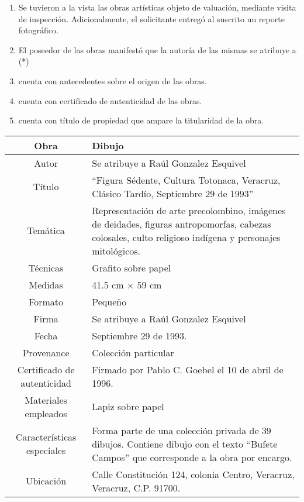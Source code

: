 \begin{enumerate}[1.]

\item Se tuvieron a la vista las obras artísticas objeto de valuaci\'on, mediante visita de inspecci\'on.
Adicionalmente, el solicitante entreg\'o al suscrito un reporte fotogr\'afico.
\item  El poseedor de las obras manifest\'o que la autor\'ia de las mismas se atribuye a (*)
\item \insertar cuenta con antecedentes sobre el origen de las obras.
\item \insertar cuenta con certificado de autenticidad de las obras.
\item \insertar cuenta con t\'itulo de propiedad que ampare la titularidad de la obra.

\end{enumerate}

\begin{table}[H]
\centering
\begin{tabular}{|c|m{}|}
\hline
Obra& Dibujo	\\
\hline
Autor & Se atribuye a Ra\'ul Gonzalez Esquivel\\
\hline
T\'itulo & ``Figura S\'edente, Cultura Totonaca, Veracruz, Cl\'asico Tard\'io, Septiembre 29 de 1993'' \\
\hline
Tem\'atica & Representaci\'on de arte precolombino, im\'agenes de deidades, figuras antropomorfas, cabezas colosales, culto religioso ind\'igena y personajes mitol\'ogicos.\\
\hline
T\'ecnicas &Grafito sobre papel \\
\hline
Medidas & 41.5 cm $\times$ 59 cm \\
\hline
 Formato & Peque\~no \\
 \hline
 Firma & Se atribuye a Ra\'ul Gonzalez Esquivel \\
 \hline
 Fecha & Septiembre 29 de 1993. \\
 \hline
 Provenance & Colecci\'on particular\\
 \hline
 Certificado de autenticidad& Firmado por Pablo C. Goebel el 10 de abril de 1996.  \\
 \hline 
  Materiales empleados & Lapiz sobre papel\\
 \hline
 Caracter\'isticas especiales & Forma parte de una colecci\'on privada de 39 dibujos. 
Contiene dibujo con el texto ``Bufete Campos'' que corresponde a la obra por encargo. \\
\hline 
Ubicaci\'on & Calle Constituci\'on 124, colonia Centro, Veracruz, Veracruz, C.P. 91700.\\
\hline
\end{tabular}
\end{table}

